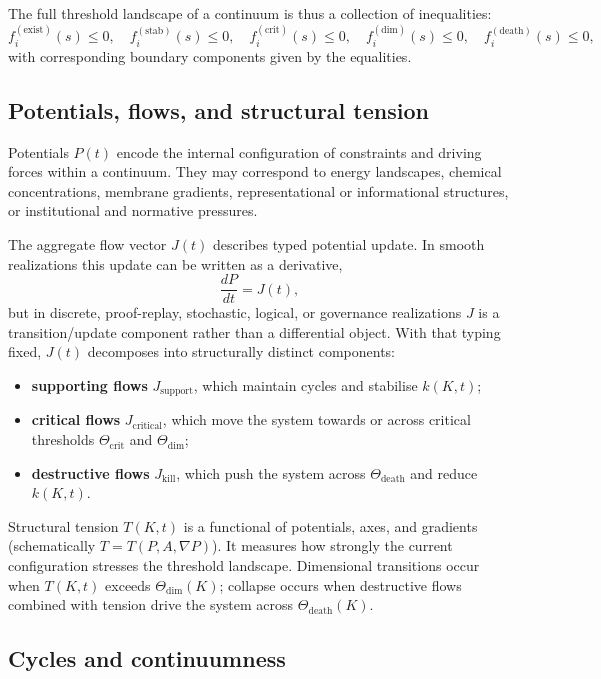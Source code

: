The full threshold landscape of a continuum is thus a collection of inequalities:
\[
    f_{i}^{(\mathrm{exist})}(s) \le 0,\quad
    f_{i}^{(\mathrm{stab})}(s) \le 0,\quad
    f_{i}^{(\mathrm{crit})}(s) \le 0,\quad
    f_{i}^{(\mathrm{dim})}(s) \le 0,\quad
    f_{i}^{(\mathrm{death})}(s) \le 0,
\]
with corresponding boundary components given by the equalities.

\subsection{Potentials, flows, and structural tension}

Potentials \(P(t)\) encode the internal configuration of constraints and driving forces within a continuum.
They may correspond to energy landscapes, chemical concentrations, membrane gradients, representational or informational structures, or institutional and normative pressures.

The aggregate flow vector \(J(t)\) describes typed potential update. In smooth
realizations this update can be written as a derivative,
\[
    \frac{dP}{dt} = J(t),
\]
but in discrete, proof-replay, stochastic, logical, or governance realizations
\(J\) is a transition/update component rather than a differential object. With
that typing fixed, \(J(t)\) decomposes into structurally distinct components:
\begin{itemize}
    \item \textbf{supporting flows} \(J_{\mathrm{support}}\), which maintain cycles and stabilise \(k(K,t)\);
    \item \textbf{critical flows} \(J_{\mathrm{critical}}\), which move the system towards or across critical thresholds \(\Theta_{\mathrm{crit}}\) and \(\Theta_{\mathrm{dim}}\);
    \item \textbf{destructive flows} \(J_{\mathrm{kill}}\), which push the system across \(\Theta_{\mathrm{death}}\) and reduce \(k(K,t)\).
\end{itemize}

Structural tension \(T(K,t)\) is a functional of potentials, axes, and gradients (schematically \(T=T(P,A,\nabla P)\)).
It measures how strongly the current configuration stresses the threshold landscape.
Dimensional transitions occur when \(T(K,t)\) exceeds \(\Theta_{\mathrm{dim}}(K)\); collapse occurs when destructive flows combined with tension drive the system across \(\Theta_{\mathrm{death}}(K)\).

\subsection{Cycles and continuumness}

